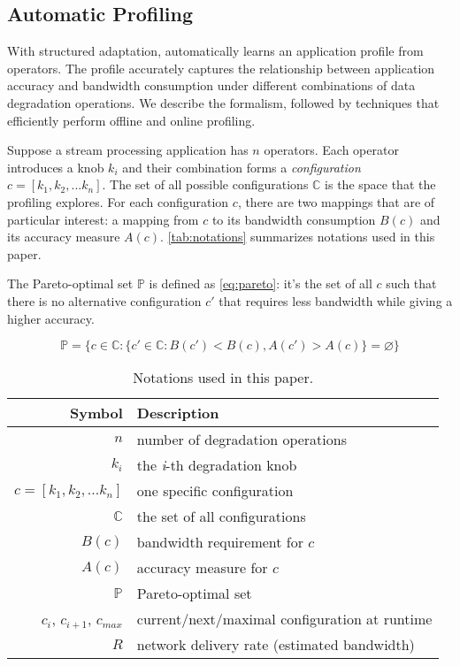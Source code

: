 \subsection{Automatic Profiling}
\label{sec:automatic-profiling}

With structured adaptation, \sysname{} automatically learns an application
profile from \maybe{} operators. The profile accurately captures the
relationship between application accuracy and bandwidth consumption under
different combinations of data degradation operations. We describe the
formalism, followed by techniques that efficiently perform offline and online
profiling.

 Suppose a stream processing application has $n$
\maybe{} operators. Each operator introduces a knob $k_i$ and their combination
forms a \textit{configuration} $c = [k_{1}, k_{2}, ... k_{n}]$. The set of all
possible configurations $\mathbb{C}$ is the space that the profiling
explores. For each configuration $c$, there are two mappings that are of
particular interest: a mapping from $c$ to its bandwidth consumption $B(c)$ and
its accuracy measure $A(c)$. \autoref{tab:notations} summarizes notations used
in this paper.

The Pareto-optimal set $\mathbb{P}$ is defined as \autoref{eq:pareto}: it's the
set of all $c$ such that there is no alternative configuration $c'$ that
requires less bandwidth while giving a higher accuracy.

{\small \vspace{-1em}
  \begin{equation}
  \mathbb{P} = \{ c \in \mathbb{C} : \{ c' \in \mathbb{C}: B(c') < B(c),
  A(c') > A(c) \} = \varnothing\}
  \label{eq:pareto}
\end{equation}
}%

\begin{table}
  \footnotesize
  \centering
  \begin{tabular}{r l}
    \toprule
    \textbf{Symbol} & \textbf{Description} \\
    \midrule
    $n$ & number of degradation operations \\
    $k_i$ & the \textit{i}-th degradation knob \\
    $c = [k_{1}, k_{2}, ... k_{n}]$ & one specific configuration \\
    $\mathbb{C}$ & the set of all configurations \\
    \midrule
    $B(c)$ & bandwidth requirement for $c$ \\
    $A(c)$ & accuracy measure for $c$ \\
    $\mathbb{P}$ & Pareto-optimal set \\
    \midrule
    $c_i$, $c_{i+1}$, $c_{max}$ & current/next/maximal configuration at runtime \\
    $R$ & network delivery rate (estimated bandwidth) \\
    \bottomrule
  \end{tabular}
  \caption{Notations used in this paper.}
  \label{tab:notations}
\end{table}

